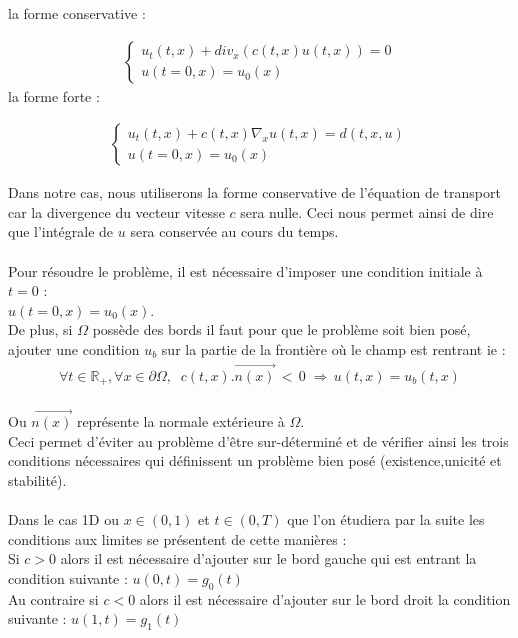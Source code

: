 \documentclass[12pt]{article}
\begin{document}
la forme conservative :

\begin{eqnarray}
\left\{ 
    \begin{array}{llll}
        u_t(t,x)+div_x(c(t,x)u(t,x))=0
        \\u(t=0,x)=u_0(x)
       	\end{array}
    \right .
\end{eqnarray}
la forme forte : 

\begin{eqnarray}
\left\{ 
    \begin{array}{llll}
        u_t(t,x)+c(t,x)\nabla_xu(t,x)=d(t,x,u)
        \\u(t=0,x)=u_0(x)
       	\end{array}
    \right .
\end{eqnarray}

\noindent Dans notre cas, nous utiliserons la forme conservative de l'équation de transport car la divergence du vecteur vitesse $c$ sera nulle. Ceci nous permet ainsi de dire que l'intégrale de $u$ sera conservée au cours du temps. 
\\
\\Pour résoudre le problème, il est nécessaire d'imposer une condition initiale à $t=0$ : \\$u(t=0,x)=u_0(x)$.
\\De plus, si $\Omega$ possède des bords il faut pour que le problème soit bien posé, ajouter  une condition $u_{b}$ sur la partie de la frontière où le champ est rentrant ie :
\\
\begin{eqnarray}
\forall t\in \mathbb{R}_{+}, \forall x\in \partial\Omega,\;\;c(t,x).\overrightarrow{n(x)}\,<\,0\; \Rightarrow\, u(t,x) = u_b(t,x)
\end{eqnarray}
\\
Ou $\overrightarrow{n(x)}$ représente la normale extérieure à $\Omega$.
\\Ceci permet d'éviter au problème d'être sur-déterminé et de vérifier ainsi les trois conditions nécessaires qui définissent un problème bien posé (existence,unicité et stabilité).
\\ 
\\Dans le cas 1D ou $x\in (0,1)$ et $t\in (0,T)$ que l'on étudiera par la suite les conditions aux limites se présentent de cette manières :
\\Si $c>0$ alors il est nécessaire d'ajouter sur le bord gauche qui est entrant la condition suivante : $u(0,t)=g_0(t)$
\\ Au contraire si $c<0$ alors il est nécessaire d'ajouter sur le bord droit la condition suivante : $u(1,t)=g_1(t)$ 
\\
\end{document}

